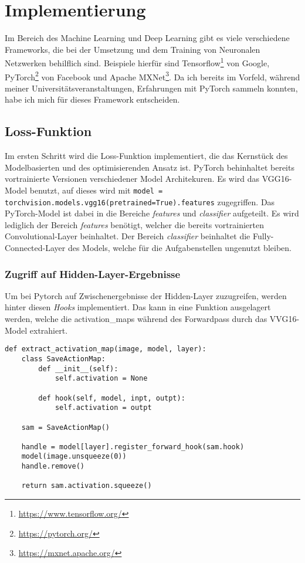 \chapter{Implementierung}
\label{cha:implementation}

Im Bereich des Machine Learning und Deep Learning gibt es viele verschiedene Frameworks, die bei der Umsetzung und dem Training von Neuronalen Netzwerken
behilflich sind. Beispiele hierfür sind Tensorflow\footnote{\url{https://www.tensorflow.org/}} von Google, PyTorch\footnote{\url{https://pytorch.org/}} von Facebook und Apache MXNet\footnote{\url{https://mxnet.apache.org/}}. Da ich bereits im Vorfeld, während meiner Universitätsveranstaltungen, Erfahrungen mit PyTorch sammeln konnten, habe ich mich für dieses Framework entscheiden.

\section{Loss-Funktion}

Im ersten Schritt wird die Loss-Funktion implementiert, die das Kernstück des Modelbasierten und des optimisierenden Ansatz ist.
PyTorch behinhaltet bereits vortrainierte Versionen verschiedener Model Architekuren. Es wird das VGG16-Model benutzt, auf dieses
wird mit \texttt{model = torchvision.models.vgg16(pretrained=True).features} zugegriffen. Das PyTorch-Model ist dabei in die Bereiche \textit{features} und 
\textit{classifier} aufgeteilt. Es wird lediglich der Bereich \textit{features} benötigt, welcher die bereits vortrainierten Convolutional-Layer beinhaltet.
Der Bereich \textit{classifier} beinhaltet die Fully-Connected-Layer des Models, welche für die Aufgabenstellen ungenutzt bleiben.

\pagebreak

\subsection{Zugriff auf Hidden-Layer-Ergebnisse}

Um bei Pytorch auf Zwischenergebnisse der Hidden-Layer zuzugreifen, werden hinter diesen \textit{Hooks} implementiert. Das kann in eine Funktion ausgelagert werden, welche die \gls{activation_map}s während des Forwardpass durch das VVG16-Model extrahiert.

\begin{listing}[ht]
\begin{verbatim}
def extract_activation_map(image, model, layer):
    class SaveActionMap:
        def __init__(self):
            self.activation = None

        def hook(self, model, inpt, outpt):
            self.activation = outpt

    sam = SaveActionMap()

    handle = model[layer].register_forward_hook(sam.hook)
    model(image.unsqueeze(0))
    handle.remove()

    return sam.activation.squeeze()
\end{verbatim}
\end{listing}

